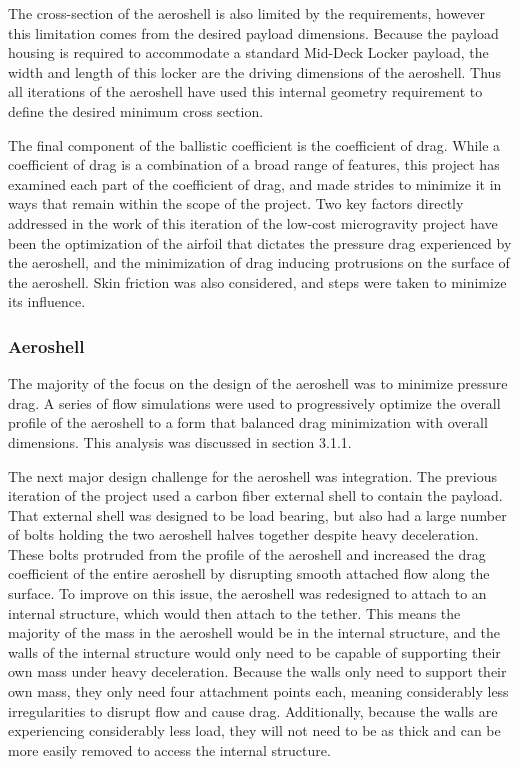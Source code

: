 \indent The cross-section of the aeroshell is also limited by the requirements, however this limitation comes from the desired payload dimensions. Because the payload housing is required to accommodate a standard Mid-Deck Locker payload, the width and length of this locker are the driving dimensions of the aeroshell. Thus all iterations of the aeroshell have used this internal geometry requirement to define the desired minimum cross section.

\indent The final component of the ballistic coefficient is the coefficient of drag. While a coefficient of drag is a combination of a broad range of features, this project has examined each part of the coefficient of drag, and made strides to minimize it in ways that remain within the scope of the project. Two key factors directly addressed in the work of this iteration of the low-cost microgravity project have been the optimization of the airfoil that dictates the pressure drag experienced by the aeroshell, and the minimization of drag inducing protrusions on the surface of the aeroshell. Skin friction was also considered, and steps were taken to minimize its influence.

\subsubsection{Aeroshell}

\indent\indent The majority of the focus on the design of the aeroshell was to minimize pressure drag. A series of flow simulations were used to progressively optimize the overall profile of the aeroshell to a form that balanced drag minimization with overall dimensions. This analysis was discussed in section 3.1.1. 

\indent The next major design challenge for the aeroshell was integration. The previous iteration of the project used a carbon fiber external shell to contain the payload. That external shell was designed to be load bearing, but also had a large number of bolts holding the two aeroshell halves together despite heavy deceleration. These bolts protruded from the profile of the aeroshell and increased the drag coefficient of the entire aeroshell by disrupting smooth attached flow along the surface. To improve on this issue, the aeroshell was redesigned to attach to an internal structure, which would then attach to the tether. This means the majority of the mass in the aeroshell would be in the internal structure, and the walls of the internal structure would only need to be capable of supporting their own mass under heavy deceleration. Because the walls only need to support their own mass, they only need four attachment points each, meaning considerably less irregularities to disrupt flow and cause drag. Additionally, because the walls are experiencing considerably less load, they will not need to be as thick and can be more easily removed to access the internal structure.

